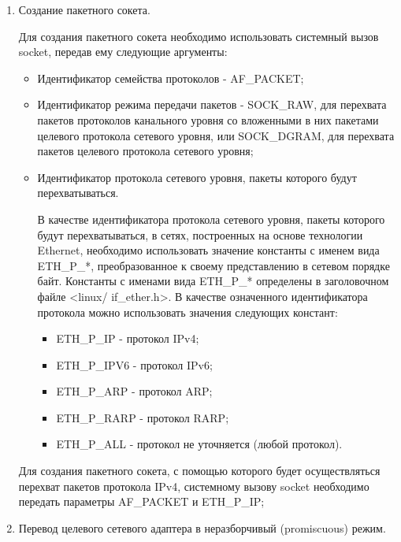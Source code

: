 	\begin{enumerate}

		\item Создание пакетного сокета.

			Для создания пакетного сокета необходимо использовать системный вызов socket, передав ему следующие
			аргументы:

			\begin{itemize}

				\item Идентификатор семейства протоколов - AF\_PACKET;
				\item Идентификатор режима передачи пакетов - SOCK\_RAW, для перехвата пакетов протоколов
				канального уровня со вложенными в них пакетами целевого протокола сетевого уровня,
				или SOCK\_DGRAM, для перехвата пакетов целевого протокола сетевого уровня;
				\item Идентификатор протокола сетевого уровня, пакеты которого будут перехватываться.

					В качестве идентификатора протокола сетевого уровня, пакеты которого будут перехватываться,
					в сетях, построенных на основе технологии Ethernet, необходимо использовать значение константы
					с именем вида ETH\_P\_*, преобразованное к своему представлению в сетевом порядке байт. Константы
					с именами вида ETH\_P\_* определены в заголовочном файле <linux/ if\_ether.h>. В качестве
					означенного идентификатора протокола можно использовать значения следующих констант:

					\begin{itemize}

						\item ETH\_P\_IP - протокол IPv4;
						\item ETH\_P\_IPV6 - протокол IPv6;
						\item ETH\_P\_ARP - протокол ARP;
						\item ETH\_P\_RARP - протокол RARP;
						\item ETH\_P\_ALL - протокол не уточняется (любой протокол).

					\end{itemize}

			\end{itemize}

			Для создания пакетного сокета, с помощью которого будет осуществляться перехват пакетов протокола IPv4,
			системному вызову socket необходимо передать параметры AF\_PACKET и ETH\_P\_IP;

		\item Перевод целевого сетевого адаптера в неразборчивый (promiscuous) режим.
		\label{lab4:sprom}


\end{enumerate}
